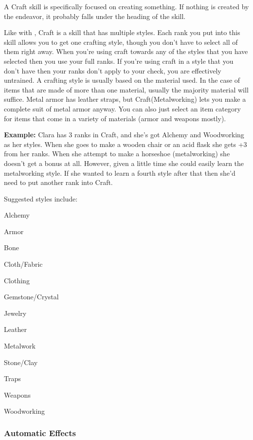 
A Craft skill is specifically focused on creating something. If nothing is created by the endeavor, it probably falls under the heading of the  skill.

Like with , Craft is a skill that has multiple styles. Each rank you put into this skill allows you to get one crafting style, though you don't have to select all of them right away. When you're using craft towards any of the styles that you have selected then you use your full ranks. If you're using craft in a style that you don't have then your ranks don't apply to your check, you are effectively untrained. A crafting style is usually based on the material used. In the case of items that are made of more than one material, usually the majority material will suffice. Metal armor has leather straps, but Craft(Metalworking) lets you make a complete suit of metal armor anyway. You can also just select an item category for items that come in a variety of materials (armor and weapons mostly).

\textbf{Example:} Clara has 3 ranks in Craft, and she's got Alchemy and Woodworking as her styles. When she goes to make a wooden chair or an acid flask she gets +3 from her ranks. When she attempt to make a horseshoe (metalworking) she doesn't get a bonus at all. However, given a little time she could easily learn the metalworking style. If she wanted to learn a fourth style after that then she'd need to put another rank into Craft.

Suggested styles include:
\begin{itemize*}
\item Alchemy
\item Armor
\item Bone
\item Cloth/Fabric
\item Clothing
\item Gemstone/Crystal
\item Jewelry
\item Leather
\item Metalwork
\item Stone/Clay
\item Traps
\item Weapons
\item Woodworking
\end{itemize*}

\subsubsection{Automatic Effects}

